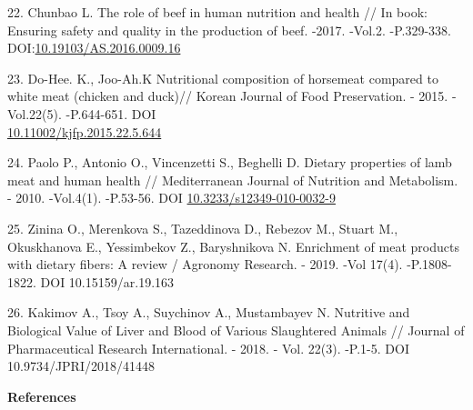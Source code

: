 \begin{references}
22. Chunbao L. The role of beef in human nutrition and health // In book:
Ensuring safety and quality in the production of beef. -2017. -Vol.2.
-P.329-338.
DOI:\href{http://dx.doi.org/10.19103/AS.2016.0009.16}{10.19103/AS.2016.0009.16}

23. Do-Hee. K., Joo-Ah.K Nutritional composition of horsemeat compared to
white meat (chicken and duck)// Korean Journal of Food Preservation. -
2015. -Vol.22(5). -P.644-651. DOI\\
\href{http://dx.doi.org/10.11002/kjfp.2015.22.5.644}{10.11002/kjfp.2015.22.5.644}

24. Paolo P., Antonio O., Vincenzetti S., Beghelli D. Dietary properties
of lamb meat and human health // Mediterranean Journal of Nutrition
and Metabolism. - 2010. -Vol.4(1). -P.53-56. DOI
\href{https://doi.org/10.3233/s12349-010-0032-9}{10.3233/s12349-010-0032-9}

25. Zinina O., Merenkova S., Tazeddinova D., Rebezov M., Stuart M.,
Okuskhanova E., Yessimbekov Z., Baryshnikova N. Enrichment of meat
products with dietary fibers: A review / Agronomy Research. - 2019.
-Vol 17(4). -P.1808-1822. DOI 10.15159/ar.19.163

26. Kakimov A., Tsoy A., Suychinov A., Mustambayev N. Nutritive and
Biological Value of Liver and Blood of Various Slaughtered Animals //
Journal of Pharmaceutical Research International. - 2018. - Vol.
22(3). -P.1-5. DOI 10.9734/JPRI/2018/41448
\end{references}

\begin{center}
{\bfseries References}
\end{center}

